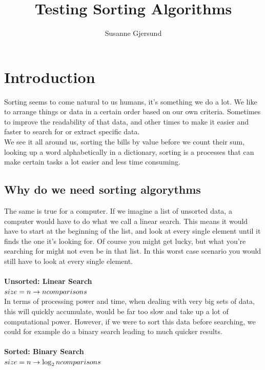 \documentclass{article}
\title{Testing Sorting Algorithms}
\author{Susanne Gjersund}
\begin{document}
	
	
	\maketitle
	\newpage
	\maketitle
	\tableofcontents
	\newpage


\section{Introduction}
	
	Sorting seems to come natural to us humans, it's something we do a lot. We like to arrange things or data in a certain order based on our own criteria. Sometimes to improve the readability of that data, and other times to make it easier and faster to search for or extract specific data.\\
	
	We see it all around us, sorting the bills by value before we count their sum, looking up a word alphabetically in a dictionary, sorting is a processes that can make certain tasks a lot easier and less time consuming.
	
\subsection{Why do we need sorting algorythms}
	
	The same is true for a computer. If we imagine a list of unsorted data, a computer would have to do what we call a linear search. This means it would have to start at the beginning of the list, and look at every single element until it finds the one it's looking for. Of course you might get lucky, but what you're searching for might not even be in that list. In this worst case scenario you would still have to look at every single element.\\
	\\
\textbf{Unsorted: Linear Search}\\
$size = n \rightarrow n  \space comparisons$\\
	
	In terms of processing power and time, when dealing with very big sets of data, this will quickly accumulate, would be far too slow and take up a lot of computational power.
	However, if we were to sort this data before searching, we could for example do a binary search leading to much quicker results.\\
	\\
	\textbf{Sorted: Binary Search}\\
$size = n \rightarrow \log_{2} n \space comparisons$\\
\end{document}
